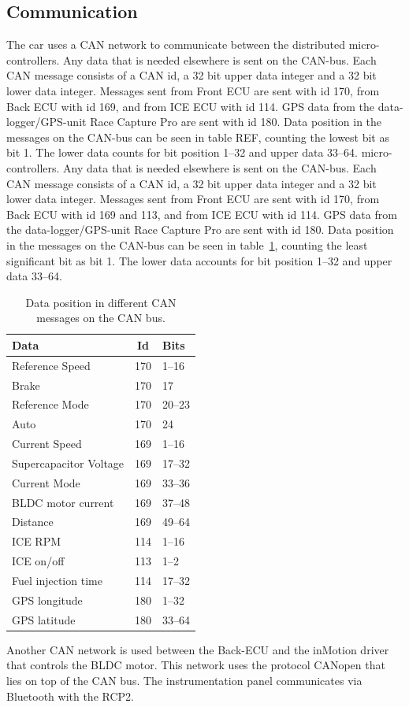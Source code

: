\subsection{Communication}
The car uses a CAN network to communicate between the distributed
micro-controllers. Any data that is needed elsewhere is sent on the CAN-bus.
Each CAN message consists of a CAN id, a 32 bit upper data integer and a 32 bit
lower data integer. Messages sent from Front ECU are sent with id 170, from
Back ECU with id 169, and from ICE ECU with id 114. GPS data from the
data-logger/GPS-unit Race Capture Pro are sent with id 180. Data position in
the messages on the CAN-bus can be seen in table REF, counting the lowest bit
as bit 1. The lower data counts for bit position 1--32 and upper data 33--64.
micro-controllers. Any data that is needed elsewhere is sent on the CAN-bus.
Each CAN message consists of a CAN id, a 32 bit upper data integer and a 32 bit
lower data integer. Messages sent from Front ECU are sent with id 170, from Back
ECU with id 169 and 113, and from ICE ECU with id 114. GPS data from the
data-logger/GPS-unit Race Capture Pro are sent with id 180. Data position in the
messages on the CAN-bus can be seen in table~\ref{table:CAN}, counting the
least significant bit as bit 1. The lower data accounts for bit
position 1--32 and upper data 33--64.
\begin{table}[H]
    \caption{Data position in different CAN messages on the CAN
    bus.}\label{table:CAN}
    \begin{center}
        \begin{tabular}{lcl}
            \textbf{Data} & \textbf{Id} & \textbf{Bits}\\
            \toprule
            Reference Speed & 170 & 1--16 \\
            Brake & 170 & 17 \\
            Reference Mode & 170 & 20--23 \\
            Auto & 170 & 24 \\
            Current Speed & 169 & 1--16 \\
            Supercapacitor Voltage & 169 & 17--32 \\ 
            Current Mode & 169 & 33--36 \\ 
            BLDC motor current & 169 & 37--48 \\
            Distance & 169 & 49--64 \\
            ICE RPM & 114 & 1--16 \\
            ICE on/off & 113 & 1--2 \\
            Fuel injection time & 114 & 17--32 \\
            GPS longitude & 180 & 1--32 \\ 
            GPS latitude & 180 & 33--64 \\
            \bottomrule
        \end{tabular}
    \end{center}
\end{table}
Another CAN network is used between the Back-ECU and the inMotion driver that
controls the BLDC motor. This network uses the protocol CANopen that
lies on top of the CAN bus. The instrumentation panel communicates via Bluetooth
with the RCP2.

